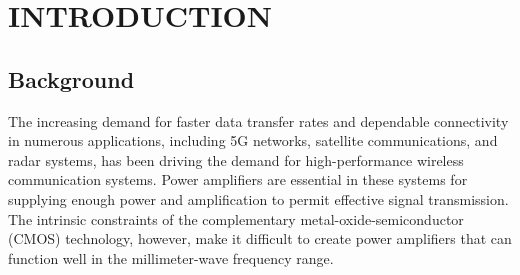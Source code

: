  \newpage

\patchcmd{\chapter}{\thispagestyle{plain}}{\thispagestyle{fancy}}{}{}
\pagestyle{main} %
\setcounter{page}{1}




\renewcommand{\theequation}{\arabic{chapter}.\arabic{equation}}

\chapter{INTRODUCTION}
\section{Background}
The increasing demand for faster data transfer rates and dependable connectivity in numerous applications, including 5G networks, satellite communications, and radar systems, has been driving the demand for high-performance wireless communication systems. Power amplifiers are essential in these systems for supplying enough power and amplification to permit effective signal transmission. The intrinsic constraints of the complementary metal-oxide-semiconductor (CMOS) technology, however, make it difficult to create power amplifiers that can function well in the millimeter-wave frequency range.

